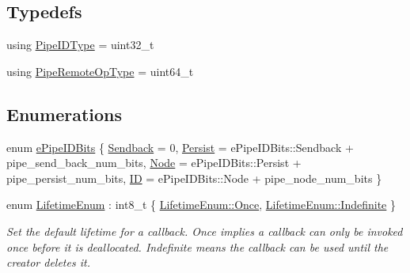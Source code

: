 \subsection*{Typedefs}
\begin{DoxyCompactItemize}
\item 
using \hyperlink{namespacevt_1_1pipe_a8aa7908de242917ac0922b9e9c85fea4}{Pipe\+I\+D\+Type} = uint32\+\_\+t
\item 
using \hyperlink{namespacevt_1_1pipe_a9f156f00d06693969d89a230a38eab52}{Pipe\+Remote\+Op\+Type} = uint64\+\_\+t
\end{DoxyCompactItemize}
\subsection*{Enumerations}
\begin{DoxyCompactItemize}
\item 
enum \hyperlink{namespacevt_1_1pipe_a21eef17afd7b326e3b65894dffa25901}{e\+Pipe\+I\+D\+Bits} \{ \hyperlink{namespacevt_1_1pipe_a21eef17afd7b326e3b65894dffa25901aaac42b3fdd37e9218dbd0e436d89267d}{Sendback} = 0, 
\hyperlink{namespacevt_1_1pipe_a21eef17afd7b326e3b65894dffa25901ac18837aff5b91489fb6ecd1d654c9fe6}{Persist} = e\+Pipe\+I\+D\+Bits\+:\+:Sendback + pipe\+\_\+send\+\_\+back\+\_\+num\+\_\+bits, 
\hyperlink{namespacevt_1_1pipe_a21eef17afd7b326e3b65894dffa25901ac0c297204ed447f62890997c285e167f}{Node} = e\+Pipe\+I\+D\+Bits\+:\+:Persist + pipe\+\_\+persist\+\_\+num\+\_\+bits, 
\hyperlink{namespacevt_1_1pipe_a21eef17afd7b326e3b65894dffa25901af10f264d6f5a73d3ea0c79b74f383933}{ID} = e\+Pipe\+I\+D\+Bits\+:\+:Node + pipe\+\_\+node\+\_\+num\+\_\+bits
 \}
\item 
enum \hyperlink{namespacevt_1_1pipe_acb42b284378c0fdac1d7c6335dc26f58}{Lifetime\+Enum} \+: int8\+\_\+t \{ \hyperlink{namespacevt_1_1pipe_acb42b284378c0fdac1d7c6335dc26f58ae1a9dc9f23534e63de9df0d540ac1611}{Lifetime\+Enum\+::\+Once}, 
\hyperlink{namespacevt_1_1pipe_acb42b284378c0fdac1d7c6335dc26f58af55dbf14245df4e3c834b3edd8495b52}{Lifetime\+Enum\+::\+Indefinite}
 \}\begin{DoxyCompactList}\small\item\em Set the default lifetime for a callback. Once implies a callback can only be invoked once before it is deallocated. Indefinite means the callback can be used until the creator deletes it. \end{DoxyCompactList}
\end{DoxyCompactItemize}
